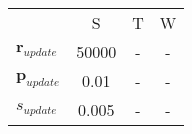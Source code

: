 \begin{center}
\begin{tabular}{l c c c} 
							& S & T & W \\
	$\mathbf{r}_{update}$ 	& 50000 & - & -\\
	$\mathbf{p}_{update}$ 		& 0.01 & - & -\\
	$s_{update}$ 					& 0.005 & - & -\\
\end{tabular}
\end{center}
